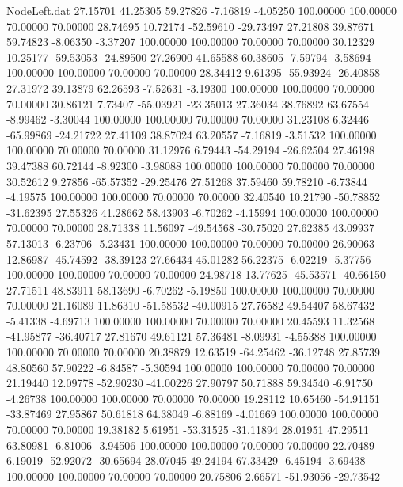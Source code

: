 \begin{filecontents}{NodeLeft.dat}
  27.15701   41.25305   59.27826    -7.16819   -4.05250  100.00000  100.00000   70.00000   70.00000   28.74695   10.72174  -52.59610  -29.73497
  27.21808   39.87671   59.74823    -8.06350   -3.37207  100.00000  100.00000   70.00000   70.00000   30.12329   10.25177  -59.53053  -24.89500
  27.26900   41.65588   60.38605    -7.59794   -3.58694  100.00000  100.00000   70.00000   70.00000   28.34412    9.61395  -55.93924  -26.40858
  27.31972   39.13879   62.26593    -7.52631   -3.19300  100.00000  100.00000   70.00000   70.00000   30.86121    7.73407  -55.03921  -23.35013
  27.36034   38.76892   63.67554    -8.99462   -3.30044  100.00000  100.00000   70.00000   70.00000   31.23108    6.32446  -65.99869  -24.21722
  27.41109   38.87024   63.20557    -7.16819   -3.51532  100.00000  100.00000   70.00000   70.00000   31.12976    6.79443  -54.29194  -26.62504
  27.46198   39.47388   60.72144    -8.92300   -3.98088  100.00000  100.00000   70.00000   70.00000   30.52612    9.27856  -65.57352  -29.25476
  27.51268   37.59460   59.78210    -6.73844   -4.19575  100.00000  100.00000   70.00000   70.00000   32.40540   10.21790  -50.78852  -31.62395
  27.55326   41.28662   58.43903    -6.70262   -4.15994  100.00000  100.00000   70.00000   70.00000   28.71338   11.56097  -49.54568  -30.75020
  27.62385   43.09937   57.13013    -6.23706   -5.23431  100.00000  100.00000   70.00000   70.00000   26.90063   12.86987  -45.74592  -38.39123
  27.66434   45.01282   56.22375    -6.02219   -5.37756  100.00000  100.00000   70.00000   70.00000   24.98718   13.77625  -45.53571  -40.66150
  27.71511   48.83911   58.13690    -6.70262   -5.19850  100.00000  100.00000   70.00000   70.00000   21.16089   11.86310  -51.58532  -40.00915
  27.76582   49.54407   58.67432    -5.41338   -4.69713  100.00000  100.00000   70.00000   70.00000   20.45593   11.32568  -41.95877  -36.40717
  27.81670   49.61121   57.36481    -8.09931   -4.55388  100.00000  100.00000   70.00000   70.00000   20.38879   12.63519  -64.25462  -36.12748
  27.85739   48.80560   57.90222    -6.84587   -5.30594  100.00000  100.00000   70.00000   70.00000   21.19440   12.09778  -52.90230  -41.00226
  27.90797   50.71888   59.34540    -6.91750   -4.26738  100.00000  100.00000   70.00000   70.00000   19.28112   10.65460  -54.91151  -33.87469
  27.95867   50.61818   64.38049    -6.88169   -4.01669  100.00000  100.00000   70.00000   70.00000   19.38182    5.61951  -53.31525  -31.11894
  28.01951   47.29511   63.80981    -6.81006   -3.94506  100.00000  100.00000   70.00000   70.00000   22.70489    6.19019  -52.92072  -30.65694
  28.07045   49.24194   67.33429    -6.45194   -3.69438  100.00000  100.00000   70.00000   70.00000   20.75806    2.66571  -51.93056  -29.73542

\end{filecontents}

